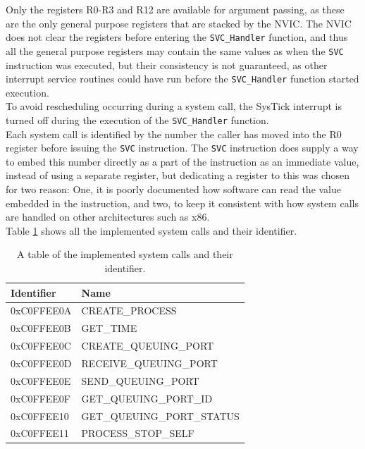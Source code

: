Only the registers R0-R3 and R12 are available for argument passing, as these
are the only general purpose registers that are stacked by the NVIC. The NVIC
does not clear the registers before entering the \texttt{SVC\_Handler} function,
and thus all the general purpose registers may contain the same values as when
the \texttt{SVC} instruction was executed, but their consistency is not
guaranteed, as other interrupt service routines could have run before the
\texttt{SVC\_Handler} function started execution.\\
To avoid rescheduling occurring during a system call, the SysTick interrupt is
turned off during the execution of the \texttt{SVC\_Handler} function.\\
Each system call is identified by the number the caller has moved into the R0
register before issuing the \texttt{SVC} instruction. The \texttt{SVC}
instruction does supply a way to embed this number directly as a part of the
instruction as an immediate value, instead of using a separate register, but
dedicating a register to this was chosen for two reason: One, it is poorly
documented how software can read the value embedded in the instruction, and two,
to keep it consistent with how system calls are handled on other architectures
such as x86.\\
Table \ref{tab:syscalls} shows all the implemented system calls and their
identifier.

\begin{table}
\centering
	\begin{tabular}{| l | l |}
		\hline
		Identifier		&	Name \\
		\hline
		0xC0FFEE0A		&	CREATE\_PROCESS 			\\
		\hline
		0xC0FFEE0B		&	GET\_TIME					\\
		\hline
		0xC0FFEE0C		&	CREATE\_QUEUING\_PORT 		\\
		\hline
		0xC0FFEE0D		&	RECEIVE\_QUEUING\_PORT 		\\
		\hline
		0xC0FFEE0E		&	SEND\_QUEUING\_PORT 		\\
		\hline
		0xC0FFEE0F		&	GET\_QUEUING\_PORT\_ID 		\\
		\hline
		0xC0FFEE10		&	GET\_QUEUING\_PORT\_STATUS	\\
		\hline
		0xC0FFEE11		&	PROCESS\_STOP\_SELF 		\\
		\hline
	\end{tabular}
\caption{A table of the implemented system calls and their identifier.}
\label{tab:syscalls}
\end{table}

